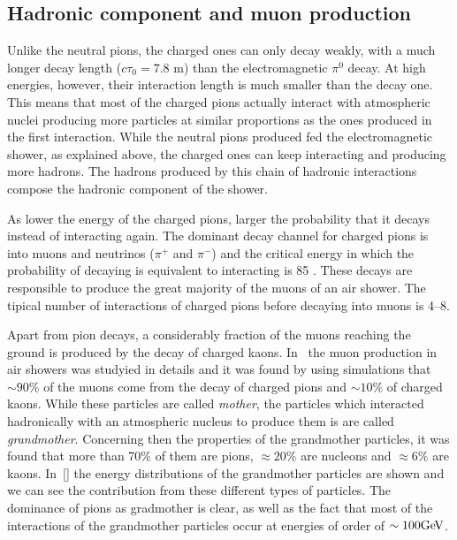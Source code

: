 \subsection{Hadronic component and muon production}
\label{sec:showers:phen:had}

Unlike the neutral pions, the charged ones can only decay weakly,
with a much longer decay length ($c\tau_0=7.8$ m)
than the electromagnetic $\pi^0$ decay.  
At high energies, however, their interaction length
is much smaller than the decay one. This means that most
of the charged pions actually interact with atmospheric nuclei
producing more particles at similar proportions as the ones produced
in the first interaction. While the neutral pions produced
fed the electromagnetic shower, as explained above, the charged ones
can keep interacting and producing more hadrons. The hadrons
produced by this chain of hadronic interactions compose the
hadronic component of the shower.

As lower the energy of the charged pions, larger the probability
that it decays instead of interacting again. The dominant decay channel
for charged pions is into muons and neutrinos ($\pi^+$ and $\pi^-$)
and the critical energy in which the probability of decaying is
equivalent to interacting is 85 \GeV. These decays are responsible
to produce the great majority of the muons of an air shower.
The tipical number of interactions of charged pions before
decaying into muons is 4--8. 


Apart from pion decays, a considerably fraction of the muons reaching
the ground is produced by the decay of charged kaons. In~\cite{} the muon
production in air showers was studyied in details and it was found
by using simulations that $\sim 90\%$ of the muons come from the decay
of charged pions and $\sim 10\%$ of charged kaons. While these particles
are called \emph{mother}, the particles which interacted hadronically
with an atmospheric nucleus to produce them is are called \emph{grandmother}.
Concerning then the properties of the grandmother particles,
it was found that more than 70\% of them are pions, $\approx 20\%$ are nucleons
and $\approx 6\%$ are kaons. In~\cref{} the energy distributions of the
grandmother particles are shown and we can see the contribution from these
different types of particles. The dominance of pions as gradmother is clear,
as well as the fact that most of the interactions of the grandmother particles
occur at energies of order of $\sim 100 \mbox{Ge\kern-0.1em V}$.


